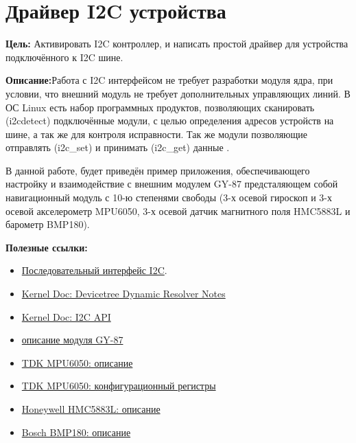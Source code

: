 \chapter{Драйвер I2C устройства}
\textbf{Цель:} Активировать I2C контроллер, и написать простой драйвер для устройства подключённого к I2C шине.

\vspace{5mm}
\textbf{Описание:}Работа с I2C интерфейсом не требует разработки модуля ядра, при условии, что внешний модуль не требует дополнительных управляющих линий. В ОС Linux есть набор программных продуктов, позволяющих сканировать (i2cdetect) подключённые модули, с целью определения адресов устройств на шине, а так же для контроля исправности. Так же модули позволяющие отправлять (i2c\_set) и принимать (i2c\_get) данные .

В данной работе, будет приведён пример приложения, обеспечивающего настройку и взаимодействие с внешним модулем GY-87 предсталяющем собой навигационный модуль с 10-ю степенями свободы (3-х осевой гироскоп и 3-х осевой акселерометр MPU6050, 3-х осевой датчик магнитного поля HMC5883L и барометр BMP180). 

\vspace{5mm}
\textbf{Полезные ссылки:}
\begin{itemize}
	\item \href{http://www.gaw.ru/html.cgi/txt/interface/iic/start.htm}{Последовательный интерфейс I2C}.
	\item \href{https://docs.kernel.org/devicetree/dynamic-resolution-notes.html}{Kernel Doc: Devicetree Dynamic Resolver Notes}
	\item \href{https://www.kernel.org/doc/html/v4.15/driver-api/i2c.html}{Kernel Doc: I2C API}	
	\item \href{https://hadex.cz/spec/m442d.pdf}{описание модуля GY-87}
	\item \href{https://invensense.tdk.com/wp-content/uploads/2015/02/MPU-6000-Datasheet1.pdf}{TDK MPU6050: описание}
	\item \href{https://invensense.tdk.com/wp-content/uploads/2015/02/MPU-6000-Register-Map1.pdf}{TDK MPU6050: конфигурационный регистры}
	\item \href{https://cdn-shop.adafruit.com/datasheets/HMC5883L_3-Axis_Digital_Compass_IC.pdf}{Honeywell HMC5883L: описание}
	\item \href{https://cdn-shop.adafruit.com/datasheets/BST-BMP180-DS000-09.pdf}{Bosch BMP180: описание}
	
	
\end{itemize}


